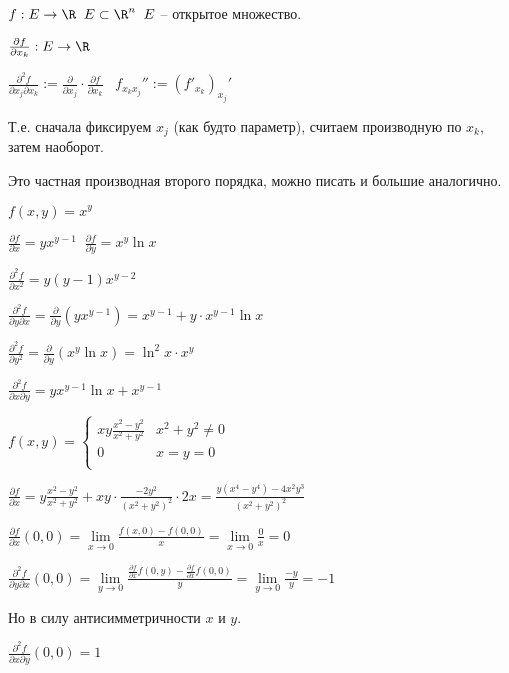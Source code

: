 
\begin{definition}\slashns
	
	$f: E \to \R \;\; E\subset \R^n \;\; E$ -- открытое множество.
	
	$\frac{\partial f}{\partial x_k} : E \to \R $
	
	$\frac{\partial^2 f}{\partial x_j \partial x_k} := \frac{\partial}{\partial x_j} \cdot \frac{\partial f}{\partial x_k} \;\;\; f_{x_k x_j}'' := (f'_{x_k})_{x_j}'$

	Т.е. сначала фиксируем $x_j$ (как будто параметр), считаем производную по $x_k$, затем наоборот.

	Это частная производная второго порядка, можно писать и большие аналогично.
\end{definition}

\begin{example}\slashns
	
	$f(x,y) = x^y$
	
	$\frac{\partial f}{\partial x} = yx^{y-1} \;\; \frac{\partial f}{\partial y} = x^y \ln x$
	
	$\frac{\partial^2 f }{\partial x^2} = y(y-1)x^{y-2}$
	
	$\frac{\partial^2 f}{\partial y \partial x} = \frac{\partial}{\partial y} (yx^{y-1}) = x^{y-1} + y\cdot x^{y-1} \ln x$
	
	$\frac{\partial^2 f}{\partial y^2 } = \frac{\partial}{\partial y}(x^y \ln x) = \ln^2 x \cdot x^y$
	
	$\frac{\partial^2 f}{\partial x \partial y} = yx^{y-1}\ln x + x^{y-1}$
\end{example}

\begin{example}\slashns
	
	$f(x, y) = \begin{cases}
	xy\frac{x^2 - y^2}{x^2+y^2} & x^2 + y^2 \ne 0\\
	0 & x=y=0\\
	\end{cases}$
	
	$\frac{\partial f}{\partial x} = y \frac{x^2 - y^2}{x^2+y^2} + xy \cdot \frac{-2y^2}{(x^2+y^2)^2}\cdot 2x = \frac{y(x^4-y^4) - 4x^2y^3}{(x^2 + y^2)^2}$
	
	$\frac{\partial f}{\partial x}(0, 0) = \lim\limits_{x \to 0} \frac{f(x, 0) - f(0, 0)}{x} = \lim\limits_{x \to 0} \frac{0}{x} = 0$
	
	$\frac{\partial^2 f}{\partial y \partial x}(0, 0) = \lim\limits_{y \to 0} \frac{\frac{\partial f}{\partial x}f(0, y) - \frac{\partial f}{\partial x}f(0, 0)}{y} = \lim\limits_{y \to 0} \frac{-y}{y} = -1 $
	
	Но в силу антисимметричности $x$ и $y$.
	
	$\frac{\partial^2 f}{\partial x \partial y}(0, 0) = 1$
\end{example}

